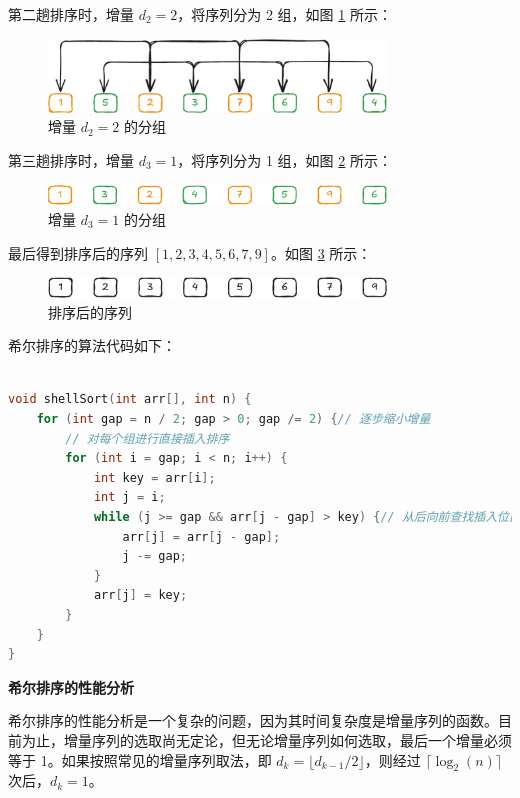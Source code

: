 \documentclass[lang=cn,newtx,10pt,scheme=chinese]{../elegantbook}
\begin{document}
第二趟排序时，增量 $d_2 = 2$，将序列分为 2 组，如图 \ref{fig:shellSort2} 所示：
\begin{figure}[h!]
    \centering
    \includegraphics[width=0.8\textwidth]{./figure/pdf/cropped/shell(b).pdf}
    \caption{增量 $d_2 = 2$ 的分组}
    \label{fig:shellSort2}
\end{figure}

第三趟排序时，增量 $d_3 = 1$，将序列分为 1 组，如图 \ref{fig:shellSort3} 所示：
\begin{figure}[h!]
    \centering
    \includegraphics[width=0.8\textwidth]{./figure/pdf/cropped/shell(c).pdf}
    \caption{增量 $d_3 = 1$ 的分组}
    \label{fig:shellSort3}
\end{figure}

最后得到排序后的序列 $[1,2,3,4,5,6,7,9]$。如图 \ref{fig:shellSort4} 所示：
\begin{figure}[h!]
    \centering
    \includegraphics[width=0.8\textwidth]{./figure/pdf/cropped/shell(d).pdf}
    \caption{排序后的序列}
    \label{fig:shellSort4}
\end{figure}

希尔排序的算法代码如下：
\begin{lstlisting}[language=C++, caption=希尔排序的算法代码]

void shellSort(int arr[], int n) {
    for (int gap = n / 2; gap > 0; gap /= 2) {// 逐步缩小增量
        // 对每个组进行直接插入排序
        for (int i = gap; i < n; i++) {
            int key = arr[i];
            int j = i;
            while (j >= gap && arr[j - gap] > key) {// 从后向前查找插入位置
                arr[j] = arr[j - gap];
                j -= gap;
            }
            arr[j] = key;
        }
    }
}

\end{lstlisting}

\textbf{希尔排序的性能分析}

希尔排序的性能分析是一个复杂的问题，因为其时间复杂度是增量序列的函数。目前为止，增量序列的选取尚无定论，但无论增量序列如何选取，最后一个增量必须等于 1。如果按照常见的增量序列取法，即 $d_k = \lfloor d_{k-1} / 2 \rfloor$，则经过 $\lceil \log_2(n) \rceil$ 次后，$d_k = 1$。
\end{document}
